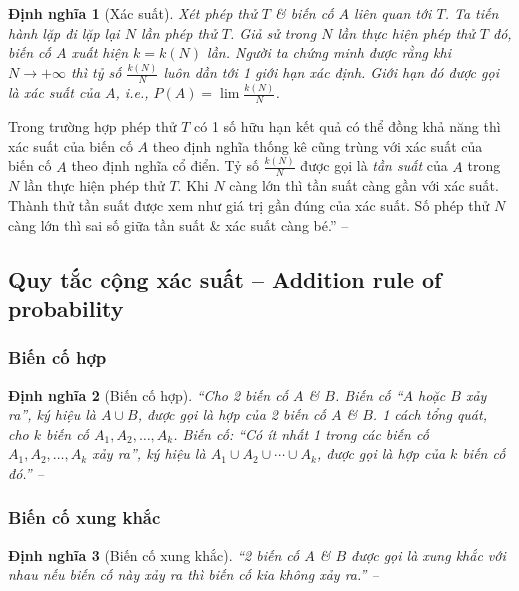 \documentclass[oneside]{book}
\numberwithin{equation}{section}
\newtheorem{dinhnghia}{Định nghĩa}[section]
\begin{document}
\begin{dinhnghia}[Xác suất]
	Xét phép thử $T$ \& biến cố $A$ liên quan tới $T$. Ta tiến hành lặp đi lặp lại $N$ lần phép thử $T$. Giả sử trong $N$ lần thực hiện phép thử $T$ đó, biến cố $A$ xuất hiện $k = k(N)$ lần. Người ta chứng minh được rằng khi $N\to+\infty$ thì tỷ số $\frac{k(N)}{N}$ luôn dần tới 1 giới hạn xác định. Giới hạn đó được gọi là \emph{xác suất} của $A$, i.e., $P(A) = \lim\frac{k(N)}{N}$.
\end{dinhnghia}
Trong trường hợp phép thử $T$ có 1 số hữu hạn kết quả có thể đồng khả năng thì xác suất của biến cố $A$ theo định nghĩa thống kê cũng trùng với xác suất của biến cố $A$ theo định nghĩa cổ điển. Tỷ số $\frac{k(N)}{N}$ được gọi là \emph{tần suất} của $A$ trong $N$ lần thực hiện phép thử $T$. Khi $N$ càng lớn thì tần suất càng gần với xác suất. Thành thử tần suất được xem như giá trị gần đúng của xác suất. Số phép thử $N$ càng lớn thì sai số giữa tần suất \& xác suất càng bé.'' -- \cite[pp. 98--99]{TL_chuyen_Toan_Dai_So_Giai_Tich_11}

\subsection{Quy tắc cộng xác suất -- Addition rule of probability}

\subsubsection{Biến cố hợp}

\begin{dinhnghia}[Biến cố hợp]
	``Cho 2 biến cố $A$ \& $B$. Biến cố ``$A$ hoặc $B$ xảy ra'', ký hiệu là $A\cup B$, được gọi là \emph{hợp} của 2 biến cố $A$ \& $B$. 1 cách tổng quát, cho $k$ biến cố $A_1,A_2,\ldots,A_k$. Biến cố: ``Có ít nhất 1 trong các biến cố $A_1,A_2,\ldots,A_k$ xảy ra'', ký hiệu là $A_1\cup A_2\cup\cdots\cup A_k$, được gọi là \emph{hợp} của $k$ biến cố đó.'' -- \cite[p. 99]{TL_chuyen_Toan_Dai_So_Giai_Tich_11}
\end{dinhnghia}

\subsubsection{Biến cố xung khắc}

\begin{dinhnghia}[Biến cố xung khắc]
	``2 biến cố $A$ \& $B$ được gọi là \emph{xung khắc} với nhau nếu biến cố này xảy ra thì biến cố kia không xảy ra.'' -- \cite[p. 99]{TL_chuyen_Toan_Dai_So_Giai_Tich_11}
\end{dinhnghia}
\end{document}
